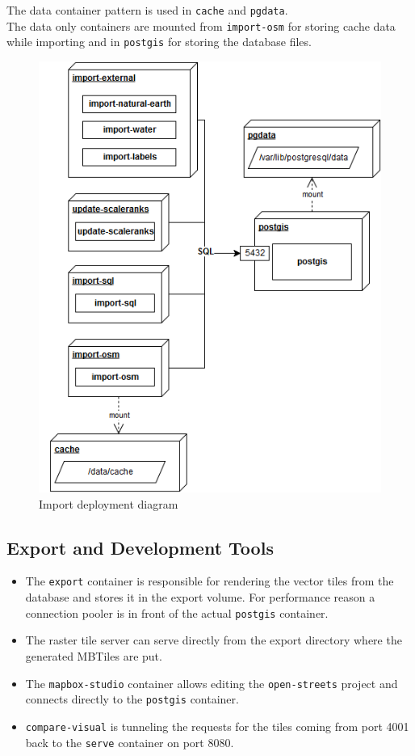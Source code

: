 The data container pattern\cite{2_container42.com_2015} is used in \texttt{cache} and \texttt{pgdata}. \\
The data only containers are mounted from \texttt{import-osm} for storing cache data while importing and in \texttt{postgis} for storing the database files.

\begin{figure}[H]
\centering
  \includegraphics[scale=0.6]{images/deployment_diagram_import.png}
  \caption{Import deployment diagram}
\end{figure}

\newpage
\subsection{Export and Development Tools}

\begin{itemize}
\item The \texttt{export} container is responsible for rendering the vector tiles from the database and stores it in the export volume. For performance reason a connection pooler is in front of the actual \texttt{postgis} container.
\item The raster tile server can serve directly from the export directory where the generated MBTiles are put.
\item The \texttt{mapbox-studio} container allows editing the \texttt{open-streets} project and connects directly to the \texttt{postgis} container.
\item \texttt{compare-visual} is tunneling the requests for the tiles coming from port 4001 back to the \texttt{serve} container on port 8080.
\end{itemize}

